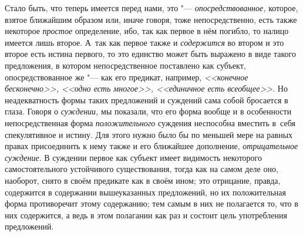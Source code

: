 Стало быть, что теперь имеется перед нами, это "--- {\em опосредствованное,}
которое, взятое ближайшим образом или, иначе говоря, тоже
непосредственно, есть также некоторое {\em простое}
определение, ибо, так как первое в нём погибло, то налицо
имеется лишь второе. А~так как первое также и {\em содержится} во
втором и это второе есть истина первого, то это единство может быть
выражено в виде такого предложения, в котором
непосредственное поставлено как субъект, опосредствованное же
"--- как его предикат, например, {\em <<конечное бесконечно>>,
<<одно есть многое>>, <<единичное есть всеобщее>>}.
Но неадекватность формы таких предложений и суждений сама
собой бросается в глаза. Говоря о {\em суждении,} мы
показали, что его форма вообще и в особенности непосредственная форма
{\em положительного}
суждения неспособна вместить в~себя спекулятивное и истину.
Для этого нужно было бы по меньшей мере на равных правах присоединить к
нему также и его ближайшее дополнение,
{\em отрицательное суждение}.
В суждении первое как субъект имеет видимость некоторого
самостоятельного устойчивого существования, тогда как на самом деле оно,
наоборот, снято в своём предикате как в своём ином; это отрицание,
правда, содержится в содержании вышеуказанных предложений, но их
положительная форма противоречит этому содержанию; тем самым в них не
полагается то, что в них содержится, а ведь в этом полагании как раз и
состоит цель употребления предложений.

